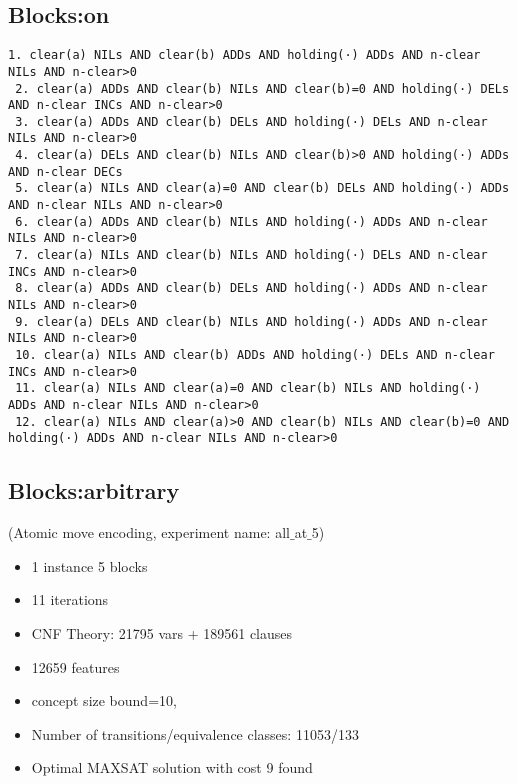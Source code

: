 \documentclass[a4paper]{article}
\begin{document}
\subsection{Blocks:on}
\begin{Verbatim}[fontsize=\footnotesize]
 1. clear(a) NILs AND clear(b) ADDs AND holding(·) ADDs AND n-clear NILs AND n-clear>0
 2. clear(a) ADDs AND clear(b) NILs AND clear(b)=0 AND holding(·) DELs AND n-clear INCs AND n-clear>0
 3. clear(a) ADDs AND clear(b) DELs AND holding(·) DELs AND n-clear NILs AND n-clear>0
 4. clear(a) DELs AND clear(b) NILs AND clear(b)>0 AND holding(·) ADDs AND n-clear DECs
 5. clear(a) NILs AND clear(a)=0 AND clear(b) DELs AND holding(·) ADDs AND n-clear NILs AND n-clear>0
 6. clear(a) ADDs AND clear(b) NILs AND holding(·) ADDs AND n-clear NILs AND n-clear>0
 7. clear(a) NILs AND clear(b) NILs AND holding(·) DELs AND n-clear INCs AND n-clear>0
 8. clear(a) ADDs AND clear(b) DELs AND holding(·) ADDs AND n-clear NILs AND n-clear>0
 9. clear(a) DELs AND clear(b) NILs AND holding(·) ADDs AND n-clear NILs AND n-clear>0
 10. clear(a) NILs AND clear(b) ADDs AND holding(·) DELs AND n-clear INCs AND n-clear>0
 11. clear(a) NILs AND clear(a)=0 AND clear(b) NILs AND holding(·) ADDs AND n-clear NILs AND n-clear>0
 12. clear(a) NILs AND clear(a)>0 AND clear(b) NILs AND clear(b)=0 AND holding(·) ADDs AND n-clear NILs AND n-clear>0
\end{Verbatim}

\subsection{Blocks:arbitrary}
(Atomic move encoding, experiment name: all$\_$at$\_$5)

\begin{itemize}
 \item 1 instance 5 blocks
 \item 11 iterations
 \item CNF Theory: 21795 vars + 189561 clauses
 \item 12659 features
 \item concept size bound=10,
 \item Number of transitions/equivalence classes: 11053/133
 \item Optimal MAXSAT solution with cost 9 found
\end{itemize}
\end{document}
